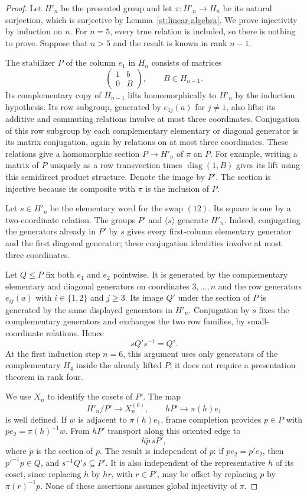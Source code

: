 \begin{proof}
Let $H'_n$ be the presented group and let $\pi:H'_n\to H_n$ be its
natural surjection, which is surjective by
Lemma~\ref{st:linear-algebra}. We prove injectivity by induction on $n$.
For $n=5$, every true relation is included, so there is nothing to prove.
Suppose that $n>5$ and the result is known in rank $n-1$.

The stabilizer $P$ of the column $e_1$ in $H_n$ consists of matrices
\[
 \begin{pmatrix}1&b\\0&B\end{pmatrix},
 \qquad B\in H_{n-1}.
\]
Its complementary copy of $H_{n-1}$ lifts homomorphically to $H'_n$ by
the induction hypothesis. Its row subgroup, generated by $e_{1j}(a)$
for $j\ne1$, also lifts: its additive and commuting relations involve
at most three coordinates. Conjugation of this row subgroup by each
complementary elementary or diagonal generator is its matrix
conjugation, again by relations on at most three coordinates. These
relations give a homomorphic section $P\to H'_n$ of $\pi$ on $P$.
For example, writing a matrix of $P$ uniquely as a row transvection
times $\operatorname{diag}(1,B)$ gives its lift using this semidirect
product structure. Denote the image by $P'$. The section is injective
because its composite with $\pi$ is the inclusion of $P$.

Let $s\in H'_n$ be the elementary word for the swap $(12)$. Its square
is one by a two-coordinate relation. The groups $P'$ and $\langle
s\rangle$ generate $H'_n$. Indeed, conjugating the generators already
in $P'$ by $s$ gives every first-column elementary generator and the
first diagonal generator; these conjugation identities involve at
most three coordinates.

Let $Q\leq P$ fix both $e_1$ and $e_2$ pointwise. It is generated by
the complementary elementary and diagonal generators on coordinates
$3,\ldots,n$ and the row generators $e_{ij}(a)$ with $i\in\{1,2\}$
and $j\geq3$. Its image $Q'$ under the section of $P$ is generated by
the same displayed generators in $H'_n$. Conjugation by $s$ fixes the
complementary generators and exchanges the two row families, by
small-coordinate relations. Hence
\[
 sQ's^{-1}=Q'.
\]
At the first induction step $n=6$, this argument uses only generators
of the complementary $H_4$ inside the already lifted $P$; it does not
require a presentation theorem in rank four.

We use $X_n$ to identify the cosets of $P'$. The map
\[
 H'_n/P'\longrightarrow X_n^{(0)},\qquad
 hP'\longmapsto\pi(h)e_1
\]
is well defined. If $w$ is adjacent to $\pi(h)e_1$, frame completion
provides $p\in P$ with $p e_2=\pi(h)^{-1}w$. From $hP'$ transport
along this oriented edge to
\[
 h\widetilde p\,sP',
\]
where $\widetilde p$ is the section of $p$. The result is independent
of $p$: if $p e_2=p'e_2$, then $p'^{-1}p\in Q$, and
$s^{-1}Q's\subseteq P'$. It is also independent of the representative
$h$ of its coset, since replacing $h$ by $hr$, with $r\in P'$, may
be offset by replacing $p$ by $\pi(r)^{-1}p$. None of these assertions
assumes global injectivity of $\pi$.


\end{proof}

